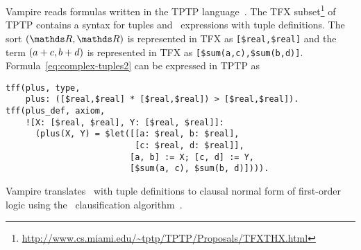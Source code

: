 Vampire reads formulas written in the TPTP language~\cite{tff0}. The TFX subset\footnote{\url{http://www.cs.miami.edu/~tptp/TPTP/Proposals/TFXTHX.html}} of TPTP contains a syntax for tuples and \LETIN\ expressions with tuple definitions. The sort $(\R,\R)$ is represented in TFX as \lstinline'[$real,$real]' and the term $({a+c,b+d})$ is represented in TFX as \lstinline'[$sum(a,c),$sum(b,d)]'. Formula~\ref{eq:complex-tuples2} can be expressed in TPTP as
\begin{lstlisting}[language=tptp]
tff(plus, type,
    plus: ([$real,$real] * [$real,$real]) > [$real,$real]).
tff(plus_def, axiom,
    ![X: [$real, $real], Y: [$real, $real]]:
      (plus(X, Y) = $let([[a: $real, b: $real],
                          [c: $real, d: $real]],
                         [a, b] := X; [c, d] := Y,
                         [$sum(a, c), $sum(b, d)]))).
\end{lstlisting}

Vampire translates \LETIN\ with tuple definitions to clausal normal form of first-order logic using the \newcnf\ clausification algorithm~\cite{FOOLCNF}.
